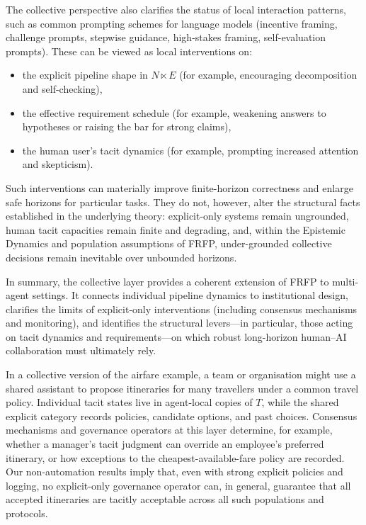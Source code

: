 The collective perspective also clarifies the status of local interaction patterns, such as common prompting schemes for language models (incentive framing, challenge prompts, stepwise guidance, high-stakes framing, self-evaluation prompts). These can be viewed as local interventions on:
\begin{itemize}
  \item the explicit pipeline shape in $N \ltimes E$ (for example, encouraging decomposition and self-checking),
  \item the effective requirement schedule (for example, weakening answers to hypotheses or raising the bar for strong claims),
  \item the human user's tacit dynamics (for example, prompting increased attention and skepticism).
\end{itemize}
Such interventions can materially improve finite-horizon correctness and enlarge safe horizons for particular tasks. They do not, however, alter the structural facts established in the underlying theory: explicit-only systems remain ungrounded, human tacit capacities remain finite and degrading, and, within the Epistemic Dynamics and population assumptions of FRFP, under-grounded collective decisions remain inevitable over unbounded horizons.

In summary, the collective layer provides a coherent extension of FRFP to multi-agent settings. It connects individual pipeline dynamics to institutional design, clarifies the limits of explicit-only interventions (including consensus mechanisms and monitoring), and identifies the structural levers---in particular, those acting on tacit dynamics and requirements---on which robust long-horizon human--AI collaboration must ultimately rely.

In a collective version of the airfare example, a team or organisation might use a shared assistant to propose itineraries for many travellers under a common travel policy. Individual tacit states live in agent-local copies of $T$, while the shared explicit category records policies, candidate options, and past choices. Consensus mechanisms and governance operators at this layer determine, for example, whether a manager's tacit judgment can override an employee's preferred itinerary, or how exceptions to the cheapest-available-fare policy are recorded. Our non-automation results imply that, even with strong explicit policies and logging, no explicit-only governance operator can, in general, guarantee that all accepted itineraries are tacitly acceptable across all such populations and protocols.

